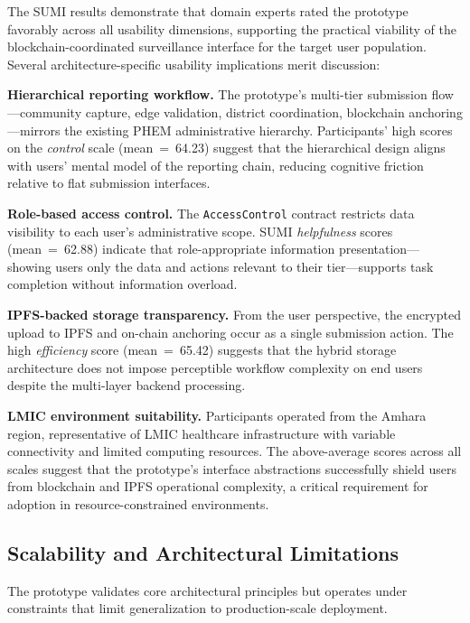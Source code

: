 \documentclass[AMA,LATO1COL]{WileyNJD-v2}
\begin{document}
The SUMI results demonstrate that domain experts rated the prototype favorably across all usability dimensions, supporting the practical viability of the blockchain-coordinated surveillance interface for the target user population. Several architecture-specific usability implications merit discussion:

\textbf{Hierarchical reporting workflow.} The prototype's multi-tier submission flow---community capture, edge validation, district coordination, blockchain anchoring---mirrors the existing PHEM administrative hierarchy. Participants' high scores on the \emph{control} scale (mean~=~64.23) suggest that the hierarchical design aligns with users' mental model of the reporting chain, reducing cognitive friction relative to flat submission interfaces.

\textbf{Role-based access control.} The \texttt{AccessControl} contract restricts data visibility to each user's administrative scope. SUMI \emph{helpfulness} scores (mean~=~62.88) indicate that role-appropriate information presentation---showing users only the data and actions relevant to their tier---supports task completion without information overload.

\textbf{IPFS-backed storage transparency.} From the user perspective, the encrypted upload to IPFS and on-chain anchoring occur as a single submission action. The high \emph{efficiency} score (mean~=~65.42) suggests that the hybrid storage architecture does not impose perceptible workflow complexity on end users despite the multi-layer backend processing.

\textbf{LMIC environment suitability.} Participants operated from the Amhara region, representative of LMIC healthcare infrastructure with variable connectivity and limited computing resources. The above-average scores across all scales suggest that the prototype's interface abstractions successfully shield users from blockchain and IPFS operational complexity, a critical requirement for adoption in resource-constrained environments.

\subsection{Scalability and Architectural Limitations}\label{subsec:scalability_eval}

The prototype validates core architectural principles but operates under constraints that limit generalization to production-scale deployment.
\end{document}
